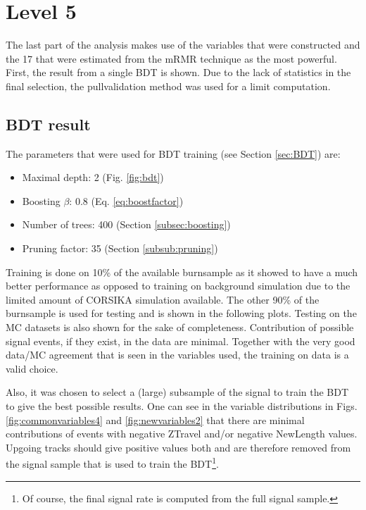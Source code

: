 \section{Level 5}
The last part of the analysis makes use of the variables that were constructed and the 17 that were estimated from the mRMR technique as the most powerful. First, the result from a single BDT is shown. Due to the lack of statistics in the final selection, the pullvalidation method was used for a limit computation.

\subsection{BDT result}
The parameters that were used for BDT training (see Section \ref{sec:BDT}) are:
\vspace{2mm}
\begin{itemize}
\item Maximal depth: 2 (Fig. \ref{fig:bdt})
\item Boosting $\beta$: 0.8 (Eq. \ref{eq:boostfactor})
\item Number of trees: 400 (Section \ref{subsec:boosting})
\item Pruning factor: 35 (Section \ref{subsub:pruning})
\end{itemize}
\vspace{2mm}
\noindent Training is done on 10\% of the available burnsample as it showed to have a much better performance as opposed to training on background simulation due to the limited amount of CORSIKA simulation available. The other 90\% of the burnsample is used for testing and is shown in the following plots. Testing on the MC datasets is also shown for the sake of completeness. Contribution of possible signal events, if they exist, in the data are minimal. Together with the very good data/MC agreement that is seen in the variables used, the training on data is a valid choice.

Also, it was chosen to select a (large) subsample of the signal to train the BDT to give the best possible results. One can see in the variable distributions in Figs. \ref{fig:commonvariables4} and \ref{fig:newvariables2} that there are minimal contributions of events with negative ZTravel and/or negative NewLength values. Upgoing tracks should give positive values both and are therefore removed from the signal sample that is used to train the BDT\footnote{Of course, the final signal rate is computed from the full signal sample.}.\\

